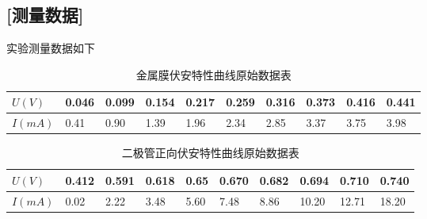 \documentclass[12pt,a4paper,UTF8]{ctexart}
\begin{document}
	
	
	\subsection*{[测量数据]}
	\par 实验测量数据如下
	\begin{table}[!h]
		\centering
		\begin{tabular}{|l|l|l|l|l|l|l|l|l|l|}
			\hline
			$U(V)$ & 0.046 & 0.099 & 0.154 & 0.217 & 0.259 & 0.316 & 0.373 & 0.416 & 0.441 \\ \hline
			$I(mA)$ & 0.41   & 0.90   & 1.39   & 1.96    & 2.34    & 2.85   & 3.37  & 3.75    & 3.98  \\ \hline
		\end{tabular}
		\caption{金属膜伏安特性曲线原始数据表}
	\end{table}

	\begin{table}[!h]
		\centering
		\begin{tabular}{|l|l|l|l|l|l|l|l|l|l|}
			\hline
			$U(V)$ & 0.412 & 0.591 & 0.618 & 0.65 & 0.670 & 0.682 & 0.694 & 0.710  & 0.740 \\ \hline
			$I(mA)$ & 0.02   & 2.22  & 3.48   & 5.60  & 7.48   & 8.86  & 10.20  & 12.71 & 18.20 \\ \hline
		\end{tabular}
		\caption{二极管正向伏安特性曲线原始数据表}
	\end{table}
	\vspace*{-0.6cm}
\end{document}
